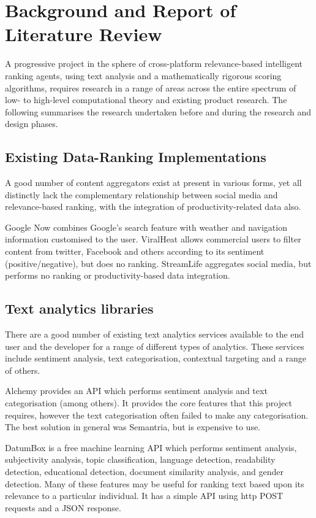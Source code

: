 \chapter{Background and Report of Literature Review}

A progressive project in the sphere of cross-platform relevance-based intelligent ranking agents, using text analysis and a mathematically rigorous scoring algorithms, requires research in a range of areas across the entire spectrum of low- to high-level computational theory and existing product research. The following summarises the research undertaken before and during the research and design phases.

\section{Existing Data-Ranking Implementations}

A good number of content aggregators exist at present in various forms, yet all distinctly lack the complementary relationship between social media and relevance-based ranking, with the integration of productivity-related data also. 

Google Now combines Google's search feature with weather and navigation information customised to the user. ViralHeat allows commercial users to filter content from twitter, Facebook and others according to its sentiment (positive/negative), but does no ranking. StreamLife aggregates social media, but performs no ranking or productivity-based data integration. 

\section{Text analytics libraries}

There are a good number of existing text analytics services available to the end user and the developer for a range of different types of analytics. These services include sentiment analysis, text categorisation, contextual targeting and a range of others. 

Alchemy provides an API which performs sentiment analysis and text categorisation (among others). It provides the core features that this project requires, however the text categorisation often failed to make any categorisation. The best solution in general was Semantria, but is expensive to use. 

DatumBox is a free machine learning API which performs sentiment analysis, subjectivity analysis, topic classification, language detection, readability detection, educational detection, document similarity analysis, and gender detection. Many of these features may be useful for ranking text based upon its relevance to a particular individual. It has a simple API using http POST requests and a JSON response. 

